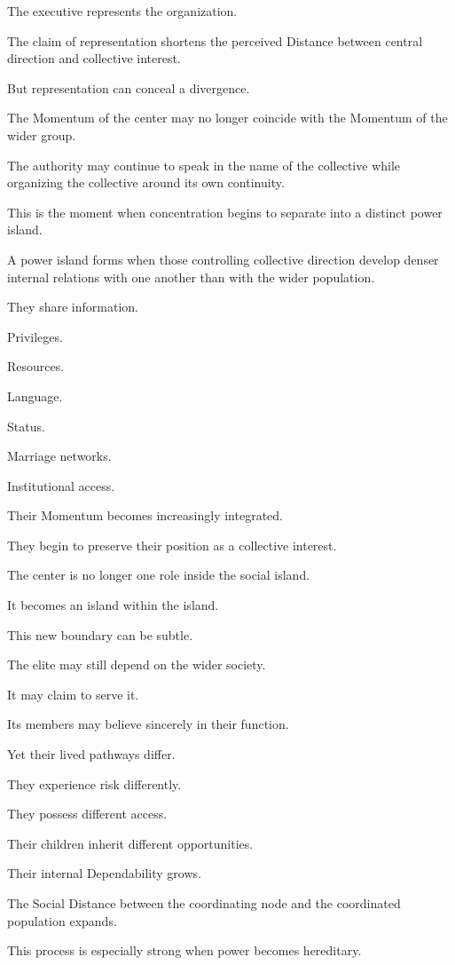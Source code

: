 The executive represents the organization.

The claim of representation shortens the perceived Distance between central direction and collective interest.

But representation can conceal a divergence.

The Momentum of the center may no longer coincide with the Momentum of the wider group.

The authority may continue to speak in the name of the collective while organizing the collective around its own continuity.

This is the moment when concentration begins to separate into a distinct power island.

A power island forms when those controlling collective direction develop denser internal relations with one another than with the wider population.

They share information.

Privileges.

Resources.

Language.

Status.

Marriage networks.

Institutional access.

Their Momentum becomes increasingly integrated.

They begin to preserve their position as a collective interest.

The center is no longer one role inside the social island.

It becomes an island within the island.

This new boundary can be subtle.

The elite may still depend on the wider society.

It may claim to serve it.

Its members may believe sincerely in their function.

Yet their lived pathways differ.

They experience risk differently.

They possess different access.

Their children inherit different opportunities.

Their internal Dependability grows.

The Social Distance between the coordinating node and the coordinated population expands.

This process is especially strong when power becomes hereditary.

